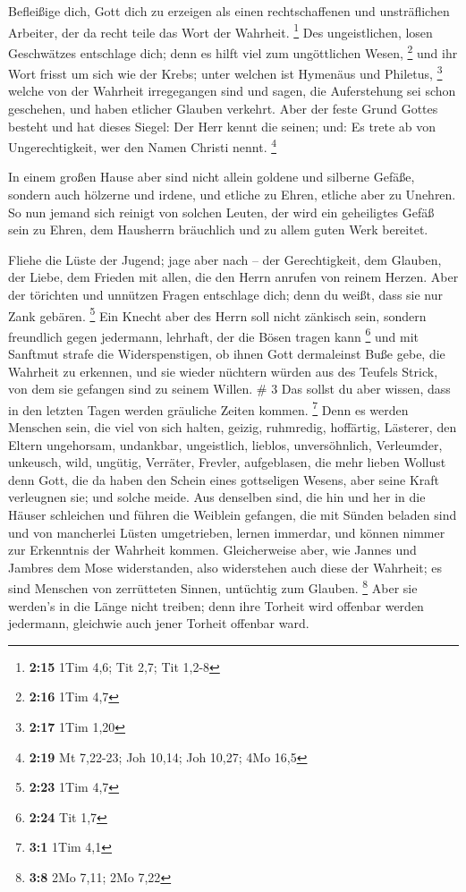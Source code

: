 Befleißige dich, Gott dich zu erzeigen als einen
rechtschaffenen und unsträflichen Arbeiter, der da recht teile das Wort
der Wahrheit. \footnote{\textbf{2:15} 1Tim 4,6; Tit 2,7; Tit 1,2-8}
 Des ungeistlichen, losen Geschwätzes entschlage dich; denn
es hilft viel zum ungöttlichen Wesen, \footnote{\textbf{2:16} 1Tim 4,7}
 und ihr Wort frisst um sich wie der Krebs; unter welchen
ist Hymenäus und Philetus, \footnote{\textbf{2:17} 1Tim 1,20}
 welche von der Wahrheit irregegangen sind und sagen, die
Auferstehung sei schon geschehen, und haben etlicher Glauben verkehrt.
 Aber der feste Grund Gottes besteht und hat dieses Siegel:
Der Herr kennt die seinen; und: Es trete ab von Ungerechtigkeit, wer den
Namen Christi nennt. \footnote{\textbf{2:19} Mt 7,22-23; Joh 10,14; Joh
  10,27; 4Mo 16,5}

 In einem großen Hause aber sind nicht allein goldene und
silberne Gefäße, sondern auch hölzerne und irdene, und etliche zu Ehren,
etliche aber zu Unehren.  So nun jemand sich reinigt von
solchen Leuten, der wird ein geheiligtes Gefäß sein zu Ehren, dem
Hausherrn bräuchlich und zu allem guten Werk bereitet.

 Fliehe die Lüste der Jugend; jage aber nach -- der
Gerechtigkeit, dem Glauben, der Liebe, dem Frieden mit allen, die den
Herrn anrufen von reinem Herzen.  Aber der törichten und
unnützen Fragen entschlage dich; denn du weißt, dass sie nur Zank
gebären. \footnote{\textbf{2:23} 1Tim 4,7}  Ein Knecht aber
des Herrn soll nicht zänkisch sein, sondern freundlich gegen jedermann,
lehrhaft, der die Bösen tragen kann \footnote{\textbf{2:24} Tit 1,7}
 und mit Sanftmut strafe die Widerspenstigen, ob ihnen Gott
dermaleinst Buße gebe, die Wahrheit zu erkennen,  und sie
wieder nüchtern würden aus des Teufels Strick, von dem sie gefangen sind
zu seinem Willen. \# 3  Das sollst du aber wissen, dass in
den letzten Tagen werden gräuliche Zeiten kommen. \footnote{\textbf{3:1}
  1Tim 4,1}  Denn es werden Menschen sein, die viel von sich
halten, geizig, ruhmredig, hoffärtig, Lästerer, den Eltern ungehorsam,
undankbar, ungeistlich,  lieblos, unversöhnlich, Verleumder,
unkeusch, wild, ungütig,  Verräter, Frevler, aufgeblasen,
die mehr lieben Wollust denn Gott,  die da haben den Schein
eines gottseligen Wesens, aber seine Kraft verleugnen sie; und solche
meide.  Aus denselben sind, die hin und her in die Häuser
schleichen und führen die Weiblein gefangen, die mit Sünden beladen sind
und von mancherlei Lüsten umgetrieben,  lernen immerdar, und
können nimmer zur Erkenntnis der Wahrheit kommen. 
Gleicherweise aber, wie Jannes und Jambres dem Mose widerstanden, also
widerstehen auch diese der Wahrheit; es sind Menschen von zerrütteten
Sinnen, untüchtig zum Glauben. \footnote{\textbf{3:8} 2Mo 7,11; 2Mo 7,22}
 Aber sie werden's in die Länge nicht treiben; denn ihre
Torheit wird offenbar werden jedermann, gleichwie auch jener Torheit
offenbar ward.

